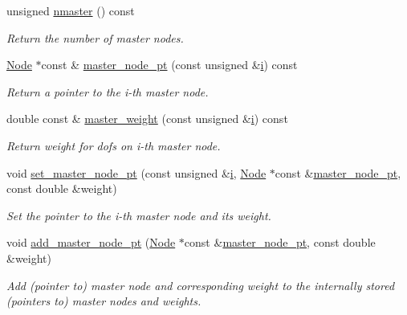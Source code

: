 \begin{DoxyCompactItemize}
unsigned \hyperlink{classoomph_1_1HangInfo_aa9c1130b58db2ff6d5eee4f923ba365c}{nmaster} () const
\begin{DoxyCompactList}\small\item\em Return the number of master nodes. \end{DoxyCompactList}\item 
\hyperlink{classoomph_1_1Node}{Node} $\ast$const  \& \hyperlink{classoomph_1_1HangInfo_a4983192a13d2ce3d12a454bd895b16e7}{master\+\_\+node\+\_\+pt} (const unsigned \&\hyperlink{cfortran_8h_adb50e893b86b3e55e751a42eab3cba82}{i}) const
\begin{DoxyCompactList}\small\item\em Return a pointer to the i-\/th master node. \end{DoxyCompactList}\item 
double const  \& \hyperlink{classoomph_1_1HangInfo_a348a41fa20beb782d42f7a2275a4397a}{master\+\_\+weight} (const unsigned \&\hyperlink{cfortran_8h_adb50e893b86b3e55e751a42eab3cba82}{i}) const
\begin{DoxyCompactList}\small\item\em Return weight for dofs on i-\/th master node. \end{DoxyCompactList}\item 
void \hyperlink{classoomph_1_1HangInfo_afe4042d5805342d5e12b6a28e376885a}{set\+\_\+master\+\_\+node\+\_\+pt} (const unsigned \&\hyperlink{cfortran_8h_adb50e893b86b3e55e751a42eab3cba82}{i}, \hyperlink{classoomph_1_1Node}{Node} $\ast$const \&\hyperlink{classoomph_1_1HangInfo_a4983192a13d2ce3d12a454bd895b16e7}{master\+\_\+node\+\_\+pt}, const double \&weight)
\begin{DoxyCompactList}\small\item\em Set the pointer to the i-\/th master node and its weight. \end{DoxyCompactList}\item 
void \hyperlink{classoomph_1_1HangInfo_af7b5808b80bc4438726383e81a1b1e3c}{add\+\_\+master\+\_\+node\+\_\+pt} (\hyperlink{classoomph_1_1Node}{Node} $\ast$const \&\hyperlink{classoomph_1_1HangInfo_a4983192a13d2ce3d12a454bd895b16e7}{master\+\_\+node\+\_\+pt}, const double \&weight)
\begin{DoxyCompactList}\small\item\em Add (pointer to) master node and corresponding weight to the internally stored (pointers to) master nodes and weights. \end{DoxyCompactList}\end{DoxyCompactItemize}
